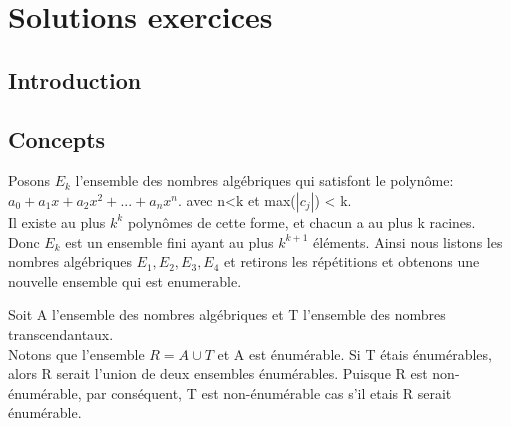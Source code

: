 
\chapter{Solutions exercices}
\label{ch:solExer}

%

\section{Introduction}





\section{Concepts}

 Posons $E_k$ l'ensemble des nombres algébriques qui satisfont le polynôme:\\
   $a_0 + a_1x + a_2x^2 + ... + a_nx^n$. avec n<k et max($|c_j|$) < k.\\
 Il existe au plus $k^k$ polynômes de cette forme,
et chacun a au plus k racines.\\
Donc $E_k$ est un ensemble fini ayant au plus $k^{k+1}$ éléments. Ainsi nous listons les nombres algébriques $E_1, E_2, E_3, E_4$ et retirons les répétitions et obtenons une nouvelle ensemble qui est enumerable.
 
 


Soit A l’ensemble des nombres algébriques et T l’ensemble des nombres transcendantaux.\\
Notons que l'ensemble $R = A \cup T$ et A est énumérable. Si T étais énumérables, alors R serait l’union de deux ensembles énumérables. Puisque R est non-énumérable, par conséquent, T est non-énumérable cas s'il etais R serait énumérable.

